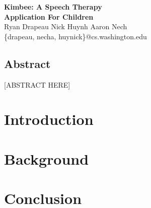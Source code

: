 \documentclass{article}
\begin{document}
\vspace{0.65 in}
\begin{centering}
\LARGE{\textbf{Kimbee: A Speech Therapy \\Application For Children}}\\[7 pt]
\Large{Ryan Drapeau \hspace{30 pt} Nick Huynh \hspace{30 pt} Aaron Nech}\\[5 pt]
\large{\{drapeau, necha, huynick\}@cs.washington.edu}

\end{centering}

\vspace*{1.25 in}

\begin{centering}
\section*{Abstract}

\end{centering}

[ABSTRACT HERE]

\newpage

\section{Introduction}

\section{Background}


\section{Conclusion}
\end{document}
